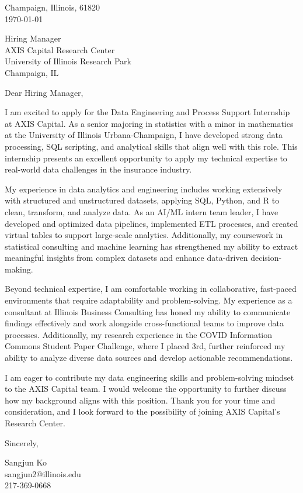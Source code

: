 \documentclass[11pt]{article}
\begin{document}
\noindent
Champaign, Illinois, 61820 \\
\today
\vspace{2em}

\noindent
Hiring Manager \\
AXIS Capital Research Center \\
University of Illinois Research Park \\
Champaign, IL \\

\vspace{1.5em}

Dear Hiring Manager,

I am excited to apply for the Data Engineering and Process Support Internship at AXIS Capital. As a senior majoring in statistics with a minor in mathematics at the University of Illinois Urbana-Champaign, I have developed strong data processing, SQL scripting, and analytical skills that align well with this role. This internship presents an excellent opportunity to apply my technical expertise to real-world data challenges in the insurance industry.

My experience in data analytics and engineering includes working extensively with structured and unstructured datasets, applying SQL, Python, and R to clean, transform, and analyze data. As an AI/ML intern team leader, I have developed and optimized data pipelines, implemented ETL processes, and created virtual tables to support large-scale analytics. Additionally, my coursework in statistical consulting and machine learning has strengthened my ability to extract meaningful insights from complex datasets and enhance data-driven decision-making.

Beyond technical expertise, I am comfortable working in collaborative, fast-paced environments that require adaptability and problem-solving. My experience as a consultant at Illinois Business Consulting has honed my ability to communicate findings effectively and work alongside cross-functional teams to improve data processes. Additionally, my research experience in the COVID Information Commons Student Paper Challenge, where I placed 3rd, further reinforced my ability to analyze diverse data sources and develop actionable recommendations.

I am eager to contribute my data engineering skills and problem-solving mindset to the AXIS Capital team. I would welcome the opportunity to further discuss how my background aligns with this position. Thank you for your time and consideration, and I look forward to the possibility of joining AXIS Capital’s Research Center.


\vspace{1em}

Sincerely,

\vspace{2em}

\noindent
Sangjun Ko\\
sangjun2@illinois.edu\\
217-369-0668
\end{document}
